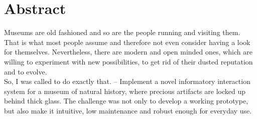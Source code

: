 \chapter{Abstract}
\label{abstract}


Museums are old fashioned and so are the people running and visiting them. That is what most people assume and therefore not even consider having a look for themselves. Nevertheless, there are modern and open minded ones, which are willing to experiment with new possibilities, to get rid of their dusted reputation and to evolve. 
\\
So, I was called to do exactly that. -- Implement a novel informatory interaction system for a museum of natural history, where precious artifacts are locked up behind thick glass. The challenge was not only to develop a working prototype, but also make it intuitive, low maintenance and robust enough for everyday use. 

%
%
%
